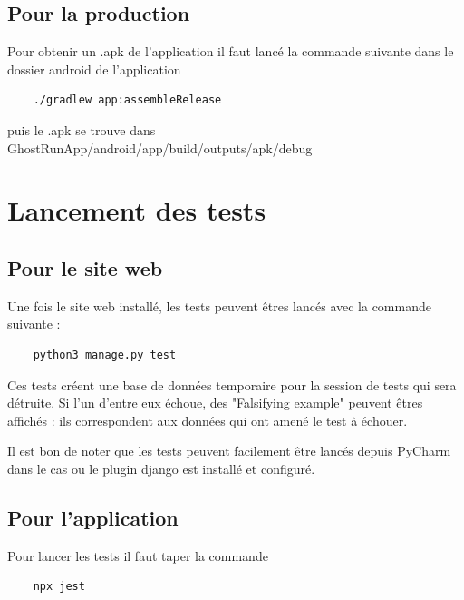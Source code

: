 \subsection{Pour la production}

Pour obtenir un .apk de l'application il faut lancé la commande suivante dans le dossier android de l'application

\begin{verbatim}
    ./gradlew app:assembleRelease
\end{verbatim}

puis le .apk se trouve dans GhostRunApp/android/app/build/outputs/apk/debug

\section{Lancement des tests}


\subsection{Pour le site web}

Une fois le site web installé, les tests peuvent êtres lancés avec la commande suivante :


\begin{verbatim}
    python3 manage.py test
\end{verbatim}

Ces tests créent une base de données temporaire pour la session de tests qui sera détruite. Si l'un d'entre eux échoue, des "Falsifying example" peuvent êtres affichés : ils correspondent aux données qui ont amené le test à échouer.

Il est bon de noter que les tests peuvent facilement être lancés depuis PyCharm dans le cas ou le plugin \Gls{django} est installé et configuré.

\subsection{Pour l'application}

Pour lancer les tests il faut taper la commande

\begin{verbatim}
    npx jest
\end{verbatim}

